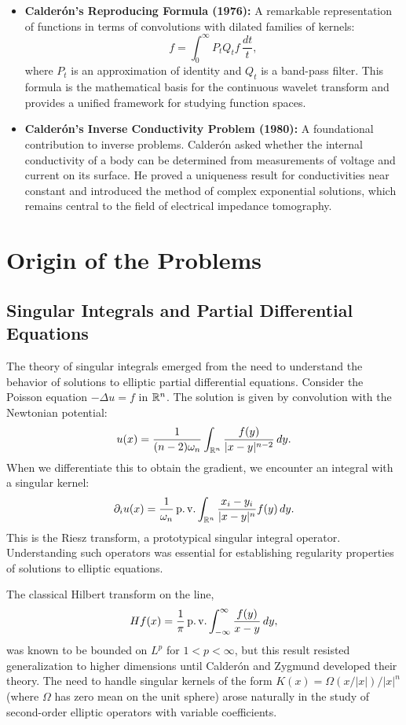 \begin{itemize}
    \item \textbf{Calder\'{o}n's Reproducing Formula (1976):} A remarkable representation of functions in terms of convolutions with dilated families of kernels:
    \[
    f = \int_0^\infty P_t Q_t f \, \frac{dt}{t},
    \]
    where $P_t$ is an approximation of identity and $Q_t$ is a band-pass filter. This formula is the mathematical basis for the continuous wavelet transform and provides a unified framework for studying function spaces.

    \item \textbf{Calder\'{o}n's Inverse Conductivity Problem (1980):} A foundational contribution to inverse problems. Calder\'{o}n asked whether the internal conductivity of a body can be determined from measurements of voltage and current on its surface. He proved a uniqueness result for conductivities near constant and introduced the method of complex exponential solutions, which remains central to the field of electrical impedance tomography.
\end{itemize}

\section{Origin of the Problems}

\subsection{Singular Integrals and Partial Differential Equations}

The theory of singular integrals emerged from the need to understand the behavior of solutions to elliptic partial differential equations. Consider the Poisson equation $-\Delta u = f$ in $\mathbb{R}^n$. The solution is given by convolution with the Newtonian potential:
\[
u(x) = \frac{1}{(n-2)\omega_n} \int_{\mathbb{R}^n} \frac{f(y)}{|x-y|^{n-2}} \,dy.
\]
When we differentiate this to obtain the gradient, we encounter an integral with a singular kernel:
\[
\partial_i u(x) = \frac{1}{\omega_n} \operatorname{p.v.} \int_{\mathbb{R}^n} \frac{x_i - y_i}{|x-y|^n} f(y) \,dy.
\]
This is the Riesz transform, a prototypical singular integral operator. Understanding such operators was essential for establishing regularity properties of solutions to elliptic equations.

The classical Hilbert transform on the line,
\[
Hf(x) = \frac1\pi \operatorname{p.v.} \int_{-\infty}^\infty \frac{f(y)}{x-y} \,dy,
\]
was known to be bounded on $L^p$ for $1 < p < \infty$, but this result resisted generalization to higher dimensions until Calder\'{o}n and Zygmund developed their theory. The need to handle singular kernels of the form $K(x) = \Omega(x/|x|)/|x|^n$ (where $\Omega$ has zero mean on the unit sphere) arose naturally in the study of second-order elliptic operators with variable coefficients.

